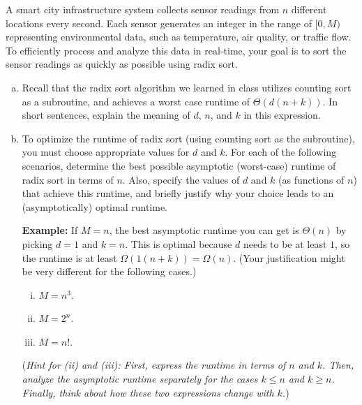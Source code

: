 \documentclass[11pt]{article}
\begin{document}
    \begin{tcolorbox}[title={Problem 1 (Optimizing Radix Sort for Sensor Data, 35 points)}] \setlength\parindent{1em}
        
    A smart city infrastructure system collects sensor readings from $n$ different locations every second. Each sensor generates an integer in the range of $[0,M)$ representing environmental data, such as temperature, air quality, or traffic flow. To efficiently process and analyze this data in real-time, your goal is to sort the sensor readings as quickly as possible using radix sort. 

    \begin{enumerate}[(a)]
    \item Recall that the radix sort algorithm we learned in class utilizes counting sort as a subroutine, and achieves a worst case runtime of $\Theta(d(n+k))$. In short sentences, explain the meaning of $d$, $n$, and $k$ in this expression.
    \item To optimize the runtime of radix sort (using counting sort as the subroutine), you must choose appropriate values for $d$ and $k$. For each of the following scenarios, determine the best possible asymptotic (worst-case) runtime of radix sort in terms of $n$. Also, specify the values of $d$ and $k$ (as functions of $n$) that achieve this runtime, and briefly justify why your choice leads to an (asymptotically) optimal runtime.

    \textbf{Example:} If $M=n$, the best asymptotic runtime you can get is $\Theta(n)$ by picking $d=1$ and $k=n$. This is optimal because $d$ needs to be at least $1$, so the runtime is at least $\Omega(1(n+k))=\Omega(n)$. (Your justification might be very different for the following cases.)
    
    \begin{enumerate}[(i)]
        \item $M=n^3$.
        \item $M=2^n$.
        \item $M=n!$.
    \end{enumerate}
    (\textit{Hint for (ii) and (iii): First, express the runtime in terms of $n$ and $k$. Then, analyze the asymptotic runtime separately for the cases $k\leq n$ and $k\geq n$. Finally, think about how these two expressions change with $k$.})
    \end{enumerate}
    \end{tcolorbox}
\end{document}
